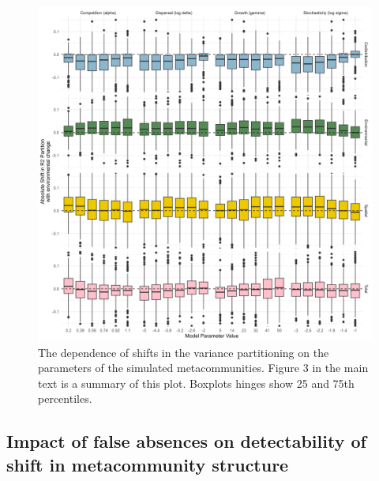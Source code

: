 \documentclass[
]{article}
\begin{document}
\begin{figure}
\centering
\includegraphics{SimulationMarkdowns/Figures/ParamShift.png}
\caption{The dependence of shifts in the variance partitioning on the
parameters of the simulated metacommunities. Figure 3 in the main text
is a summary of this plot. Boxplots hinges show 25 and 75th
percentiles.}
\end{figure}

\hypertarget{impact-of-false-absences-on-detectability-of-shift-in-metacommunity-structure}{%
\subsection{Impact of false absences on detectability of shift in
metacommunity
structure}\label{impact-of-false-absences-on-detectability-of-shift-in-metacommunity-structure}}
\end{document}
